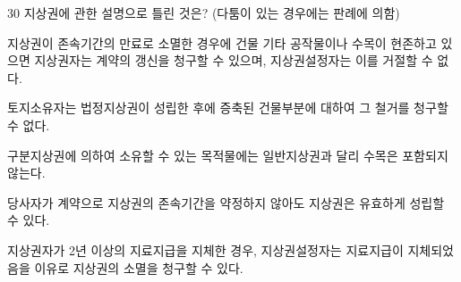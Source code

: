 \begin{question}{30}
지상권에 관한 설명으로 틀린 것은? (다툼이 있는 경우에는 판례에 의함)
\begin{choices}
  \item 지상권이 존속기간의 만료로 소멸한 경우에 건물 기타 공작물이나 수목이 현존하고 있으면 지상권자는 계약의 갱신을 청구할 수 있으며, 지상권설정자는 이를 거절할 수 없다.
  \item 토지소유자는 법정지상권이 성립한 후에 증축된 건물부분에 대하여 그 철거를 청구할 수 없다.
  \item 구분지상권에 의하여 소유할 수 있는 목적물에는 일반지상권과 달리 수목은 포함되지 않는다.
  \item 당사자가 계약으로 지상권의 존속기간을 약정하지 않아도 지상권은 유효하게 성립할 수 있다.
  \item 지상권자가 2년 이상의 지료지급을 지체한 경우, 지상권설정자는 지료지급이 지체되었음을 이유로 지상권의 소멸을 청구할 수 있다.
\end{choices}
\end{question}
